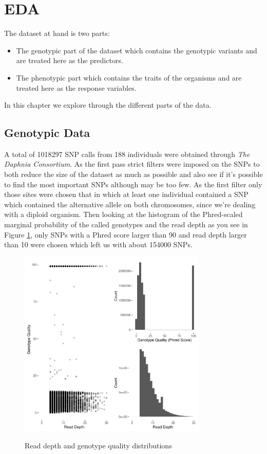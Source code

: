 \documentclass[a4paper]{article}
\begin{document}
\section{EDA}
\label{sec:data}
The dataset at hand is two parts: 
\begin{itemize}
\item The genotypic part of the dataset which contains the genotypic variants and are treated here as the predictors.
\item The phenotypic part which contains the traits of the organisms and are treated here as the response variables.
\end{itemize}
In this chapter we explore through the different parts of the data.

\subsection{Genotypic Data}
A total of 1018297 SNP calls from 188 individuals were obtained through \textit{The Daphnia Consortium}. As the first pass strict filters were imposed on the SNPs to both reduce the size of the dataset as much as possible and also see if it's possible to find the most important SNPs although may be too few. As the first filter only those sites were chosen that in which at least one individual contained a SNP which contained the alternative allele on both chromosomes, since we're dealing with a diploid organism. Then looking at the histogram of the Phred-scaled marginal probability of the called genotypes and the read depth as you see in Figure \ref{fig:hist}, only SNPs with a Phred score larger than 90 and read depth larger than 10 were chosen which left us with about 154000 SNPs.


\begin{figure}
\centering
\includegraphics[width=0.8\textwidth]{hist.pdf}
\label{fig:hist}
\caption{Read depth and genotype quality distributions}
\end{figure}
\end{document}
